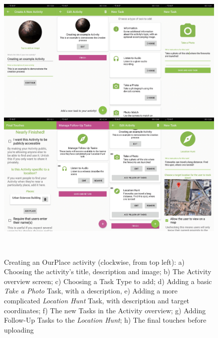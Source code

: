 \begin{figure}
  \centering
  \includegraphics[width=1\columnwidth]{images/chapter05/creation.png}
  \caption[Creating an OurPlace activity]{Creating an OurPlace activity (clockwise, from top left): a) Choosing the activity's title, description and image; b) The Activity overview screen; c) Choosing a Task Type to add; d) Adding a basic \textit{Take a Photo} Task, with a description, e) Adding a more complicated \textit{Location Hunt} Task, with description and target coordinates; f) The new Tasks in the Activity overview; g) Adding Follow-Up Tasks to the \textit{Location Hunt}; h) The final touches before uploading }~\label{fig:ActivityCreation}
\end{figure}

